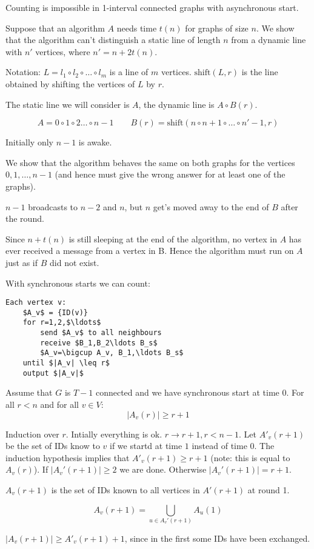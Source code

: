 \begin{thm} Counting is impossible in 1-interval connected graphs with asynchronous start.\end{thm}
\begin{pr} Suppose that an algorithm $A$ needs time $t(n)$ for graphs of size $n$. We show that the algorithm can't distinguish a static line of length $n$ from a dynamic line with $n'$ vertices, where $n'=n+2t(n)$.

Notation: $L=l_1\circ l_2\circ \ldots \circ l_m$ is a line of $m$ vertices. $\text{shift}(L,r)$ is the line obtained by shifting the vertices of $L$ by $r$.

The static line we will consider is $A$, the dynamic line is $A\circ B(r)$.

\[A = 0\circ 1 \circ 2\ldots \circ n-1 \qquad B(r) = \text{shift}(n\circ n+1\circ \ldots \circ n'-1,r)\]

Initially only $n-1$ is awake.

We show that the algorithm behaves the same on both graphs for the vertices $0,1,\ldots ,n-1$ (and hence must give the wrong answer for at least one of the graphs).


$n-1$ broadcasts to $n-2$ and $n$, but $n$ get's moved away to the end of $B$ after the round.

Since $n+t(n)$ is still sleeping at the end of the algorithm, no vertex in $A$ has ever received a message from a vertex in B. Hence the algorithm must run on $A$ just as if $B$ did not exist.
\end{pr}

With synchronous starts we can count:

\begin{lstlisting}
Each vertex v:
	$A_v$ = {ID(v)}
	for r=1,2,$\ldots$
		send $A_v$ to all neighbours
		receive $B_1,B_2\ldots B_s$
		$A_v=\bigcup A_v, B_1,\ldots B_s$
	until $|A_v| \leq r$
	output $|A_v|$
\end{lstlisting}

\begin{lem} Assume that $G$ is $T-1$ connected and we have synchronous start at time $0$. For all $r<n$ and for all $v\in V$:
\[|A_v(r)| \geq r+1\]
\end{lem}

\begin{pr} Induction over $r$. Intially everything is ok. $r\rightarrow r+1, r<n-1$. Let $A'_v(r+1)$ be the set of IDs know to $v$ if we startd at time $1$ instead of time 0. The induction hypothesis implies that $A'_v(r+1)\geq r+1$ (note: this is equal to $A_v(r)$). If $|A_v'(r+1)|\geq 2$ we are done. Otherwise $|A_v'(r+1)|=r+1$. 

$A_v(r+1)$ is the set of IDs known to all vertices in $A'(r+1)$ at round 1.

\[A_v(r+1)=\bigcup_{u\in A_v'(r+1)} A_u(1)\]

$|A_v(r+1)|\geq A'_v(r+1)+1$, since in the first some IDs have been exchanged.
\end{pr}

